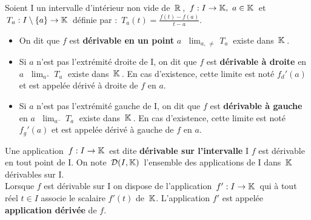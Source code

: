 Soient I un intervalle d'intérieur non vide de $\,\mathbb{R}\,$, \(\,f:I\to \mathbb{K},\ a\in \mathbb{K}\,\) et \(\,T_a:I\setminus \{a\}\to \mathbb{K}\,\) définie par : \(\,\displaystyle T_a(t)=\frac{f(t)-f(a)}{t-a}.\)\vspace{0.1cm}
\begin{itemize}[leftmargin=1cm, label=•]
    \item On dit que $f$ est \textbf{dérivable en un point} $a$ \ssi \(\;\displaystyle \lim_{a,\,\neq}\,T_a\:\) existe dans $\,\mathbb{K}\,$.
    
    \item Si $a$ n'est pas l'extrémité droite de I, on dit que $f$ est \textbf{dérivable à droite} en $a$ \ssi \(\;\displaystyle \lim_{a^+}\,T_a\;\) existe dans $\,\mathbb{K}\,$. En cas d'existence, cette limite est noté \(f_d'(a)\) et est appelée dérivé à droite de $f$ en $a$.
    
    \item Si $a$ n'est pas l'extrémité gauche de I, on dit que $f$ est \textbf{dérivable à gauche} en $a$ \ssi \(\;\displaystyle \lim_{a^-}\,T_a\;\) existe dans $\,\mathbb{K}\,$. En cas d'existence, cette limite est noté \(f_g'(a)\) et est appelée dérivé à gauche de $f$ en $a$.
\end{itemize}

\vspace{1cm}

Une application \(\,f:I\to \mathbb{K}\,\) est dite \textbf{dérivable sur l'intervalle} I \ssi $f$ est dérivable en tout point de I. On note \(\,\mathcal{D}(I,\mathbb{K})\,\) l'ensemble des applications de I dans $\,\mathbb{K}\,$ dérivables sur I.\\
Lorsque $f$ est dérivable sur I on dispose de l'application \(\, f':I\to \mathbb{K}\,\) qui à tout réel \(t\in I\) associe le scalaire \(f'(t)\) de \(\,\mathbb{K}\). L'application $f'$ est appelée \textbf{application dérivée} de $f$.

\vspace{1.3cm}

